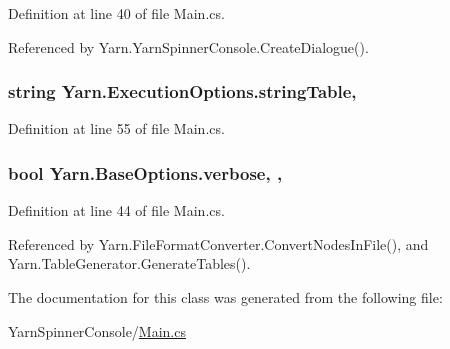 Definition at line 40 of file Main.\-cs.



Referenced by Yarn.\-Yarn\-Spinner\-Console.\-Create\-Dialogue().

\hypertarget{a00097_a7e43c3b73722956cb0f5d507e4eef527}{
\subsubsection[{string\-Table}]{\setlength{\rightskip}{0pt plus 5cm}string Yarn.\-Execution\-Options.\-string\-Table\hspace{0.3cm}{\ttfamily [get]}, {\ttfamily [set]}}}\label{a00097_a7e43c3b73722956cb0f5d507e4eef527}


Definition at line 55 of file Main.\-cs.

\hypertarget{a00035_ada4d83d1756918f362d55f6649b82b17}{
\subsubsection[{verbose}]{\setlength{\rightskip}{0pt plus 5cm}bool Yarn.\-Base\-Options.\-verbose\hspace{0.3cm}{\ttfamily [get]}, {\ttfamily [set]}, {\ttfamily [inherited]}}}\label{a00035_ada4d83d1756918f362d55f6649b82b17}


Definition at line 44 of file Main.\-cs.



Referenced by Yarn.\-File\-Format\-Converter.\-Convert\-Nodes\-In\-File(), and Yarn.\-Table\-Generator.\-Generate\-Tables().



The documentation for this class was generated from the following file\-:\begin{DoxyCompactItemize}
\item 
Yarn\-Spinner\-Console/\hyperlink{a00313}{Main.\-cs}\end{DoxyCompactItemize}
